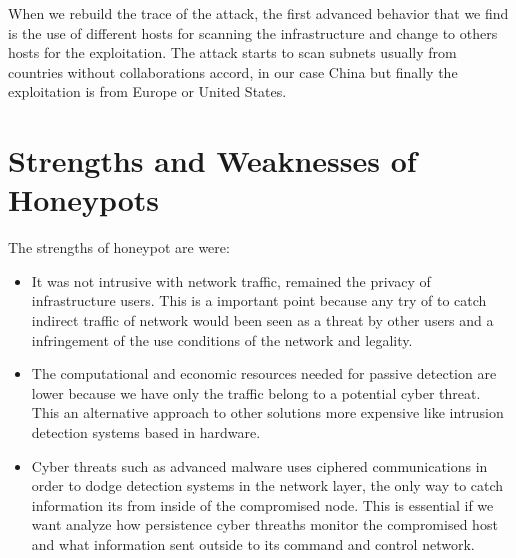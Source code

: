 \documentclass[a4paper]{llncs}
\begin{document}
When we rebuild the trace of the attack, the first advanced behavior that we find is the use of different hosts for scanning the infrastructure and change to others hosts for the exploitation. The attack starts to scan subnets usually from countries without collaborations accord, in our case China but finally the exploitation is from Europe or United States.%
	
\section{Strengths and Weaknesses of Honeypots}
\label{sec:Strengths&Weaknesse}
The strengths of honeypot are were:
\begin{itemize}
	\item It was not intrusive with network traffic, remained the privacy of infrastructure users. This is a important point because any try of to catch indirect traffic of network would been seen as a threat by other users and a infringement of the use conditions of the network and legality.
	\item The computational and economic resources needed for passive detection are lower because we have only the traffic belong to a potential cyber threat. This an alternative approach to other solutions more expensive like intrusion detection systems based in hardware.
	\item Cyber threats such as advanced malware uses ciphered communications in order to dodge detection systems in the network layer, the only way to catch information its from inside of the compromised node. This is essential if we want analyze how persistence cyber threaths monitor the compromised host and what information sent outside to its command and control network.
\end{itemize}
	
\end{document}
